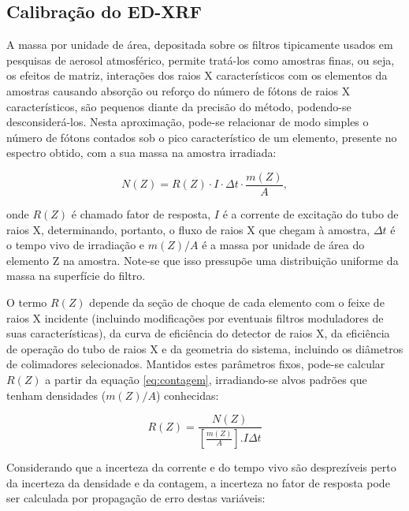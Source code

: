 \subsection{Calibração do ED-XRF}

A massa por unidade de área, depositada sobre os filtros tipicamente usados em 
pesquisas de aerosol atmosférico, permite tratá-los como amostras finas,
ou seja, os efeitos de matriz, interações dos raios X característicos com os 
elementos da amostras causando absorção ou reforço do número de fótons de 
raios X característicos, são pequenos diante da precisão do método,
podendo-se desconsiderá-los. Nesta aproximação, pode-se relacionar de modo 
simples o número de fótons contados sob o pico característico de um elemento, 
presente no espectro obtido, com a sua massa na amostra irradiada:

\begin{equation}
  \label{eq:contagem}
  N(Z) = R(Z) \cdot I \cdot \Delta t  \cdot \frac{m(Z)}{A} ,
\end{equation}

onde $R(Z)$ é chamado fator de resposta, $I$ é a corrente de excitação do tubo 
de raios X, determinando, portanto, o fluxo de raios X que chegam à amostra, 
$\Delta t$ é o tempo vivo de irradiação e $m(Z)/A$ é a massa por unidade de 
área do elemento Z na amostra. Note-se que isso pressupõe uma distribuição 
uniforme da massa na superfície do filtro.

O termo $R(Z)$ depende da seção de choque de cada elemento com o feixe de 
raios X incidente (incluindo modificações por eventuais filtros moduladores 
de suas características), da curva de eficiência do detector de raios X, 
da eficiência de operação do tubo de raios X e da geometria do sistema, 
incluindo os diâmetros de colimadores selecionados. Mantidos estes parâmetros 
fixos, pode-se calcular $R(Z)$ a partir da equação \ref{eq:contagem}, 
irradiando-se alvos padrões que tenham densidades ($m(Z)/A$) conhecidas:

\begin{equation}
  \label{eq:fator_de_resposta}
  R(Z) = \frac{N(Z)}{[\frac{m(Z)}{A}].I \Delta t}
\end{equation}

Considerando que a incerteza da corrente e do tempo vivo são desprezíveis 
perto da incerteza da densidade e da contagem, a incerteza no fator de resposta
pode ser calculada por propagação de erro destas variáveis:


